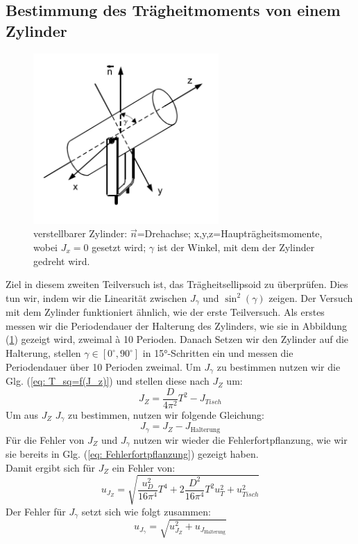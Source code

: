 \documentclass[bibliography=totocnumbered]{scrartcl}
\begin{document}
	\subsection{Bestimmung des Trägheitmoments von einem Zylinder}
	\begin{figure}[!ht]
		\centering									%
		\includegraphics[width=200pt]{fotos/gpr1/Zylinder.png}			%
		\caption{verstellbarer Zylinder: $ \vec{n} $=Drehachse; x,y,z=Haupträgheitsmomente, wobei $ J_{x}=0 $ gesetzt wird; $ \gamma $ ist der Winkel, mit dem der Zylinder gedreht wird.}							%
		\label{Abb.: Zylinder}							%
	\end{figure}
	Ziel in diesem zweiten Teilversuch ist, das Trägheitsellipsoid zu überprüfen. Dies tun wir, indem wir die Linearität zwischen $ J _{\gamma} $ und $ \sin^{2}(\gamma) $ zeigen. Der Versuch mit dem Zylinder funktioniert ähnlich, wie der erste Teilversuch. Als erstes messen wir die Periodendauer der Halterung des Zylinders, wie sie in Abbildung (\ref{Abb.: Zylinder}) gezeigt wird, zweimal à 10 Perioden. Danach Setzen wir den Zylinder auf die Halterung, stellen $ \gamma \in [0^{\circ},90^{\circ}] $ in 15°-Schritten ein und messen die Periodendauer über 10 Perioden zweimal. Um $ J_{\gamma} $ zu bestimmen nutzen wir die Glg. (\ref{eq: T_sq=f(J_z)}) und stellen diese nach $ J_{Z} $ um:
	\begin{equation}\label{eq: J_Z}
		J_{Z}=\dfrac{D}{4\pi^{2}}T^{2}-J_{Tisch}
	\end{equation}
	Um aus $ J_{Z} $ $ J_{\gamma} $ zu bestimmen, nutzen wir folgende Gleichung:
	\begin{equation}\label{eq: J_gamma}
		J_{\gamma}=J_{Z}-J_{\text{Halterung}}
	\end{equation}
Für die Fehler von $ J_{Z} $ und $ J_{\gamma} $ nutzen wir wieder die Fehlerfortpflanzung, wie wir sie bereits in Glg. (\ref{eq: Fehlerfortpflanzung}) gezeigt haben.\\
Damit ergibt sich für $ J_{Z} $ ein Fehler von:
\begin{equation}\label{eq: J_Z_err}
	u_{J_{Z}}=\sqrt{\dfrac{u_{D}^{2}}{16\pi^{4}}T^{4}+2\dfrac{D^{2}}{16\pi^{4}}T^{2}u_{T}^{2}+u_{Tisch}^{2}}
\end{equation}
Der Fehler für $ J_{\gamma} $ setzt sich wie folgt zusammen:
\begin{equation}\label{eq: u_Gamma}
	u_{J_{\gamma}}=\sqrt{u_{J_{Z}}^{2}+u_{J_{\text{Halterung}}}} 
\end{equation}
	
\end{document}

